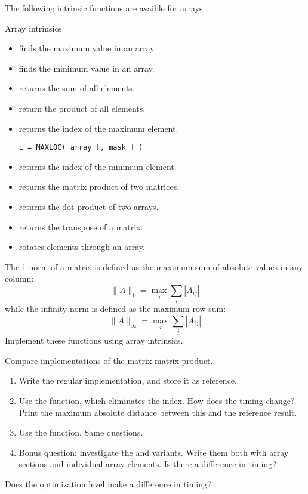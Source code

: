 The following intrinsic functions are avaible for arrays:
\begin{block}{Array intrinsics}
  \label{sl:array-funcf}
  \begin{itemize}
  \item {} finds the maximum value in an array.
  \item {} finds the minimum value in an array.
  \item {} returns the sum of all elements.
  \item {} return the product of all elements.
  \item {} returns the index of the maximum
    element.
\begin{lstlisting}
i = MAXLOC( array [, mask ] )
\end{lstlisting}
  \item {} returns the index of the minimum element.
  \item {} returns the matrix product of two matrices.
  \item {} returns the dot product of two
    arrays.
  \item {} returns the transpose of a matrix.
  \item {} rotates elements through an array.
  \end{itemize}
\end{block}

\begin{exercise}
  \label{ex:fmatnorm}
  The 1-norm of a matrix is defined as the maximum sum of absolute
  values in any column:
  \[ \|A\|_1 = \max_j \sum_i |A_{ij}| \]
  while the infinity-norm is defined as the maximum row sum:
  \[ \|A\|_\infty = \max_i \sum_j |A_{ij}| \]
  Implement these functions using array intrinsics.
\end{exercise}

\begin{exercise}
  \label{ex:fmatmul}
  Compare implementations of the matrix-matrix product.
  \begin{enumerate}
  \item Write the regular  implementation, and store it as
    reference.
  \item Use the  function, which eliminates the 
    index. How does the timing change? Print the maximum absolute
    distance between this and the reference result.
  \item Use the  function. Same questions.
  \item Bonus question: investigate the  and 
    variants. Write them both with array sections and individual array
    elements. Is there a difference in timing?
  \end{enumerate}
  Does the optimization level make a difference in timing?
\end{exercise}

